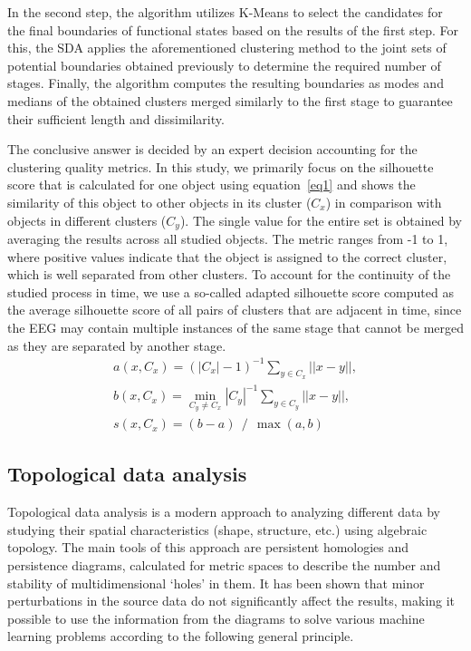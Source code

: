 \documentclass[pdflatex,sn-basic,Numbered]{sn-jnl}
\begin{document}
In the second step, the algorithm utilizes K-Means to select the candidates for the final boundaries of functional states based on the results of the first step. For this, the SDA applies the aforementioned clustering method to the joint sets of potential boundaries obtained previously to determine the required number of stages. Finally, the algorithm computes the resulting boundaries as modes and medians of the obtained clusters merged similarly to the first stage to guarantee their sufficient length and dissimilarity.

The conclusive answer is decided by an expert decision accounting for the clustering quality metrics. In this study, we primarily focus on the silhouette score that is calculated for one object using equation~\eqref{eq1} and shows the similarity of this object to other objects in its cluster ($C_x$) in comparison with objects in different clusters ($C_y$). The single value for the entire set is obtained by averaging the results across all studied objects. The metric ranges from -1 to 1, where positive values indicate that the object is assigned to the correct cluster, which is well separated from other clusters. To account for the continuity of the studied process in time, we use a so-called adapted silhouette score computed as the average silhouette score of all pairs of clusters that are adjacent in time, since the EEG may contain multiple instances of the same stage that cannot be merged as they are separated by another stage.
\begin{align}
    a(x, C_x) = {(|C_x| - 1)} ^ {-1} \sum_{y \in C_x} ||x - y||, \nonumber\\
    b(x, C_x) = \min_{C_y \ne C_x} {|C_y|} ^ {-1} \sum_{y \in C_y} ||x - y||, \nonumber\\
    s(x, C_x) = (b - a)~~/~~\max(a, b) \label{eq1}
\end{align}


\subsection{Topological data analysis}

Topological data analysis is a modern approach to analyzing different data by studying their spatial characteristics (shape, structure, etc.) using algebraic topology. The main tools of this approach are persistent homologies and persistence diagrams, calculated for metric spaces to describe the number and stability of multidimensional `holes' in them. It has been shown that minor perturbations in the source data do not significantly affect the results, making it possible to use the information from the diagrams to solve various machine learning problems according to the following general principle.
\end{document}
